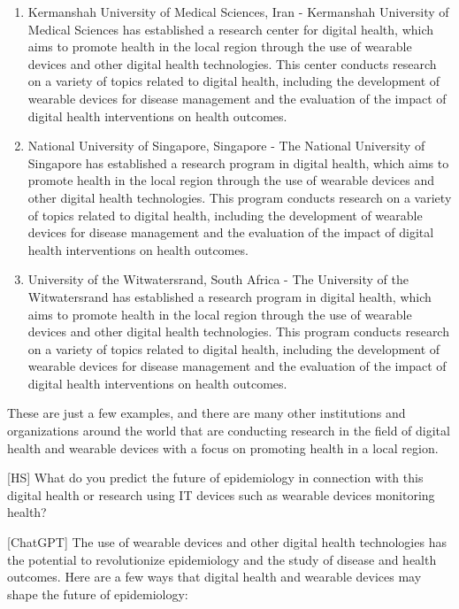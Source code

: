 \documentclass[
]{book}
\providecommand{\tightlist}{%
  \setlength{\itemsep}{0pt}\setlength{\parskip}{0pt}}
\theoremstyle{definition}
\theoremstyle{definition}
\theoremstyle{definition}
\theoremstyle{definition}
\theoremstyle{remark}
\begin{document}
\begin{enumerate}
\def\labelenumi{\arabic{enumi}.}
\tightlist
\item
  Kermanshah University of Medical Sciences, Iran - Kermanshah University of Medical Sciences has established a research center for digital health, which aims to promote health in the local region through the use of wearable devices and other digital health technologies. This center conducts research on a variety of topics related to digital health, including the development of wearable devices for disease management and the evaluation of the impact of digital health interventions on health outcomes.
\item
  National University of Singapore, Singapore - The National University of Singapore has established a research program in digital health, which aims to promote health in the local region through the use of wearable devices and other digital health technologies. This program conducts research on a variety of topics related to digital health, including the development of wearable devices for disease management and the evaluation of the impact of digital health interventions on health outcomes.
\item
  University of the Witwatersrand, South Africa - The University of the Witwatersrand has established a research program in digital health, which aims to promote health in the local region through the use of wearable devices and other digital health technologies. This program conducts research on a variety of topics related to digital health, including the development of wearable devices for disease management and the evaluation of the impact of digital health interventions on health outcomes.
\end{enumerate}

These are just a few examples, and there are many other institutions and organizations around the world that are conducting research in the field of digital health and wearable devices with a focus on promoting health in a local region.

{[}HS{]} What do you predict the future of epidemiology in connection with this digital health or research using IT devices such as wearable devices monitoring health?

{[}ChatGPT{]} The use of wearable devices and other digital health technologies has the potential to revolutionize epidemiology and the study of disease and health outcomes. Here are a few ways that digital health and wearable devices may shape the future of epidemiology:
\end{document}
